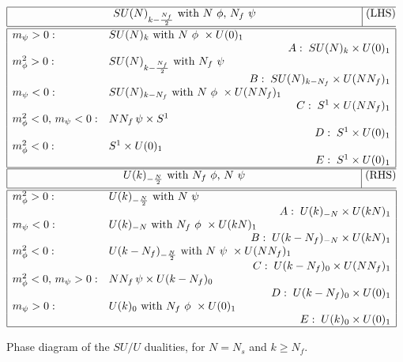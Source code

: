 \documentclass[a4paper, 12pt]{article}
\numberwithin{equation}{section}
\begin{document}
\begin{table}[ht!]
{\renewcommand{\arraystretch}{1.46}\begin{center}
$
\begin{array}{|lll|}
\hline
\multicolumn{3}{|c|}{SU(N)_{k - \frac{N_f}2} \text{ with $N$ $\phi$, $N_f$ $\psi$}} \text{ (LHS)}\\[.5em]
\hline\hline
m_\psi>0: &	SU(N)_k \text{ with $N$ $\phi$ } \times U(0)_1 & \qquad\qquad\qquad\qquad\;\;\; \\
	& \multicolumn{2}{r|}{A:\; SU(N)_k \times U(0)_1} \\
m_\phi^2>0: &	SU(N)_{k-\frac{N_f}2} \text{ with $N_f$ $\psi$} & \\
	& \multicolumn{2}{r|}{B:\; SU(N)_{k-N_f} \times U(NN_f)_1} \\
m_\psi<0: &	SU(N)_{k-N_f} \text{ with $N$ $\phi$ } \times U(NN_f)_1 & \\
	& \multicolumn{2}{r|}{C:\; S^1 \times U(NN_f)_1} \\
m_\phi^2<0,\, m_\psi<0: & N N_f\, \psi \times S^1 & \\
	& \multicolumn{2}{r|}{D:\; S^1 \times U(0)_1} \\
m_\phi^2<0: &	S^1 \times U(0)_1 & \\
	& \multicolumn{2}{r|}{E:\; S^1 \times U(0)_1} \\
\hline
\end{array}
$ \\[1.5em]
$
\begin{array}{|lll|}
\hline
\multicolumn{3}{|c|}{U(k)_{- \frac N2} \text{ with $N_f$ $\phi$, $N$ $\psi$}} \text{ (RHS)}\\[.5em]
\hline\hline
m_\phi^2>0: &	U(k)_{-\frac N2} \text{ with $N$ $\psi$} & \qquad\qquad\qquad\qquad \\
	& \multicolumn{2}{r|}{A:\; U(k)_{-N} \times U(kN)_1} \\
m_\psi<0: &	U(k)_{-N} \text{ with $N_f$ $\phi$ } \times U(kN)_1 & \\
	& \multicolumn{2}{r|}{B:\; U(k-N_f)_{-N} \times U(kN)_1} \\
m_\phi^2<0: &	U(k-N_f)_{- \frac N2} \text{ with $N$ $\psi$ } \times U(NN_f)_1 & \\
	& \multicolumn{2}{r|}{C:\; U(k-N_f)_0 \times U(NN_f)_1} \\
m_\phi^2<0,\, m_\psi>0: & N N_f\, \psi \times U(k-N_f)_0 & \\
	& \multicolumn{2}{r|}{D:\; U(k-N_f)_0 \times U(0)_1} \\
m_\psi>0: &	U(k)_0 \text{ with $N_f$ $\phi$ } \times U(0)_1 & \\
	& \multicolumn{2}{r|}{E:\; U(k)_0 \times U(0)_1} \\
\hline
\end{array}
$
\end{center}}
\caption{Phase diagram of the $SU/U$ dualities, for $N = N_s$ and $k \geq N_f$.
\label{tab: SU/U dualities case 2}}
\end{table}
\end{document}
